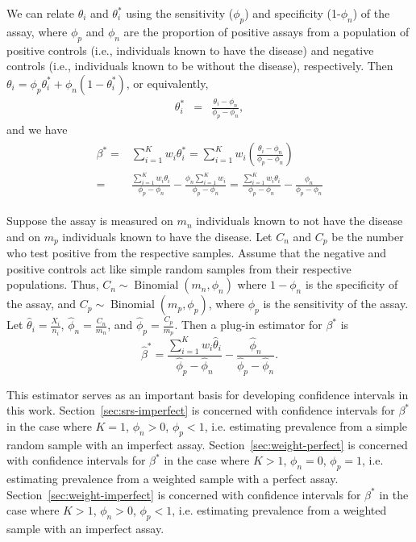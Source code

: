 \documentclass[AMA,STIX1COL]{WileyNJD-v2}
\begin{document}
We can relate $\theta_i$ and $\theta_i^*$ using the sensitivity ($\phi_p$)  and specificity (1-$\phi_n$) of the assay, 
where  $\phi_p$ and $\phi_n$  are the proportion of positive assays from a population of  positive controls (i.e., individuals known to have the disease) and 
negative controls (i.e., individuals known to be  without the disease), respectively. Then
$\theta_i = \phi_p \theta_i^* + \phi_n (1-\theta_i^*)$, or equivalently,  
\begin{eqnarray*}
\theta_i^* & = & \frac{ \theta_i - \phi_n }{\phi_p - \phi_n},
\end{eqnarray*}
and we have
\begin{align}
\begin{split}
  \beta^*   =&   \sum_{i=1}^K w_i \theta_i^* 
            =  \sum_{i=1}^K w_i \left( \frac{\theta_i - \phi_n}{\phi_p - \phi_n} \right) \\
            =&   \frac{\sum_{i=1}^K w_i \theta_i}{\phi_p - \phi_n} - \frac{\phi_n \sum_{i=1}^K w_i}{\phi_p - \phi_n} 
            =   \frac{\sum_{i=1}^K w_i \theta_i}{\phi_p - \phi_n} - \frac{\phi_n}{\phi_p - \phi_n}
            \label{eq:long-beta}
\end{split}
\end{align}


Suppose the assay is measured on \( m_n \) individuals known to not have the disease and on \( m_p \) individuals known to have the disease.
Let \( C_n \) and \( C_p \) be the number who test positive from the respective samples.
Assume that the negative and positive controls act like simple random samples from their respective populations.
Thus, \( C_n \sim \operatorname{Binomial}(m_n, \phi_n) \) where \( 1 - \phi_n \) is the specificity of the assay, and \( C_p \sim \operatorname{Binomial}(m_p, \phi_p) \), where  \( \phi_p \) is the sensitivity of the assay.
Let \( \hat{\theta}_i = \frac{X_i}{n_i} \), \( \hat{\phi}_n = \frac{C_n}{m_n} \), and \( \hat{\phi}_p = \frac{C_p}{m_p} \).
Then a plug-in estimator for \( \beta^* \) is 
\begin{equation}
    \hat{\beta}^* = \frac{\sum_{i=1}^K w_i \hat{\theta}_i}{\hat{\phi}_p - \hat{\phi}_n} - \frac{\hat{\phi}_n}{\hat{\phi}_p - \hat{\phi}_n}. \label{eq:betastarhat}
\end{equation}

This estimator serves as an important basis for developing confidence intervals in this work.
Section~\ref{sec:srs-imperfect} is concerned with confidence intervals for  \( \beta^* \) in the case where \( K = 1 \), \( \phi_n > 0 \), \( \phi_p < 1 \), i.e. estimating prevalence from a simple random sample with an imperfect assay.
Section~\ref{sec:weight-perfect} is concerned with confidence intervals for  \( \beta^* \) in the case where \( K > 1 \), \( \phi_n = 0 \), \( \phi_p = 1 \), i.e. estimating prevalence from a weighted sample with a perfect assay.
Section~\ref{sec:weight-imperfect} is concerned with confidence intervals for  \( \beta^* \) in the case where \( K > 1 \), \( \phi_n > 0 \), \( \phi_p < 1 \), i.e. estimating prevalence from a weighted sample with an imperfect assay.
\end{document}
